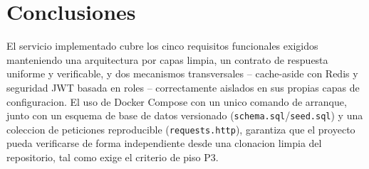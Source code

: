 \documentclass[11pt,a4paper]{article}
\begin{document}
\section{Conclusiones}

El servicio implementado cubre los cinco requisitos funcionales exigidos
manteniendo una arquitectura por capas limpia, un contrato de respuesta
uniforme y verificable, y dos mecanismos transversales -- cache-aside con
Redis y seguridad JWT basada en roles -- correctamente aislados en sus
propias capas de configuracion. El uso de Docker Compose con un unico
comando de arranque, junto con un esquema de base de datos versionado
(\texttt{schema.sql}/\texttt{seed.sql}) y una coleccion de peticiones
reproducible (\texttt{requests.http}), garantiza que el proyecto pueda
verificarse de forma independiente desde una clonacion limpia del
repositorio, tal como exige el criterio de piso P3.



\end{document}
